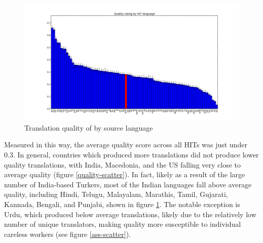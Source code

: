 \documentclass[11pt]{article}
\begin{document}

\begin{figure}[h]
\centering
\includegraphics[width=6in]{figures/quality-hitlang}
\caption{Translation quality of by source language}
\label{hitlangqual-bar}
\end{figure}

Measured in this way, the average quality score across all HITs was just under 0.3. In general, countries which produced more translations did not produce lower quality translations, with India, Macedonia, and the US falling very close to average quality (figure \ref{quality-scatter}). In fact, likely as a result of the large number of India-based Turkers, most of the Indian languages fall above average quality, including Hindi, Telugu, Malayalam, Marathis, Tamil, Gujarati, Kannada, Bengali, and Punjabi, shown in figure \ref{hitlangqual-bar}. The notable exception is Urdu, which produced below average translations, likely due to the relatively low number of unique translators, making quality more susceptible to individual careless workers (see figure \ref{ass-scatter}). 
\end{document}
